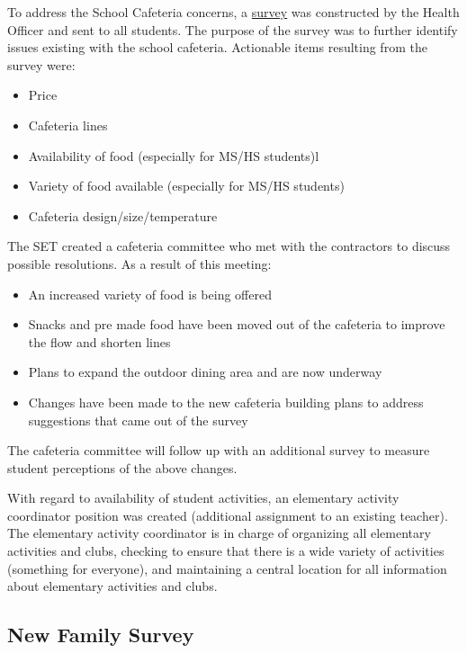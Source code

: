 To address the School Cafeteria concerns, a \href{https://docs.google.com/a/cmis.ac.th/forms/d/18wFe46SOpPVv9_jkKLEa4OqVsDkLtJkUCcM85Jul0Ik/viewanalytics}{survey} was constructed by the Health Officer and sent to all students. The purpose of the survey was to further identify issues existing with the school cafeteria. Actionable items resulting from the survey were: 

\begin{itemize}
\item Price 
\item Cafeteria lines
\item Availability of food (especially for MS/HS students)l
\item Variety of food available (especially for MS/HS students) 
\item Cafeteria design/size/temperature
\end{itemize}


The SET created a cafeteria committee who met with the contractors to discuss possible resolutions. As a result of this meeting:
\begin{itemize}
\item An increased variety of food is being offered
\item Snacks and pre made food  have been moved out of the cafeteria to improve the flow and shorten lines
\item Plans to expand the outdoor dining area and are now underway
\item Changes have been made to the new cafeteria building plans to address suggestions that came out of the survey 
\end{itemize}

The cafeteria committee will follow up with an additional survey to measure student perceptions of the above changes.

With regard to availability of student activities, an elementary activity coordinator position was created (additional assignment to an existing teacher).  The elementary activity coordinator is in charge of organizing all elementary activities and clubs, checking to ensure that there is a wide variety of activities (something for everyone), and maintaining a central location for all information about elementary activities and clubs.

\subsection{New Family Survey}

